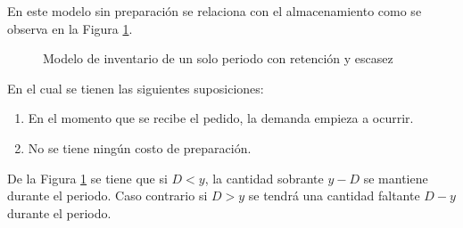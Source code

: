 En este modelo sin preparación se relaciona con el almacenamiento como se observa en la Figura \ref{fig:img12}.
\begin{figure}[h!]
    \centering
    \caption{Modelo de inventario de un solo periodo con retención y escasez}
    
    \hfill

    \label{fig:img12}
\end{figure}

En el cual se tienen las siguientes suposiciones:
\begin{enumerate}
	\item En el momento que se recibe el pedido, la demanda empieza a ocurrir.
	\item No se tiene ningún costo de preparación. 
\end{enumerate}
De la Figura \ref{fig:img12} se tiene que si $D < y$, la cantidad sobrante $y-D$ se mantiene durante el periodo. Caso contrario si $D > y$ se tendrá una cantidad faltante $D-y$ durante el periodo.

